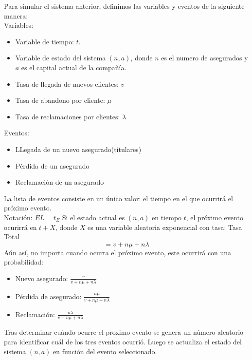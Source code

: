 \documentclass[12pt, a4paper]{article}
\begin{document}
Para simular el sistema anterior, definimos las variables y eventos de la siguiente manera:
\\
Variables: 
\begin{itemize}
    \item Variable de tiempo: $t$.
    \item Variable de estado del sistema $(n,a)$, donde $n$ es el numero de asegurados y $a$ es el capital actual de la compañía.
    \item Tasa de llegada de nuevos clientes: $v$
    \item Tasa de abandono por cliente: $\mu$
    \item Tasa de reclamaciones por clientes: $\lambda$
\end{itemize}
Eventos:
\begin{itemize}
    \item LLegada de un nuevo asegurado(titulares)
    \item Pérdida de un asegurado
    \item Reclamación de un asegurado
\end{itemize}
La lista de eventos consiste en un único valor: el tiempo en el que ocurrirá el próximo evento.\\
Notación: $EL = t_E$
Si el estado actual es $(n,a)$ en tiempo $t$, el próximo evento ocurirrá en $t + X$, donde $X$ es una variable
aleatoria exponencial con tasa:
Tasa Total $$ = v + n\mu + n\lambda$$
Aún así, no importa cuando ocurra el próximo evento, este ocurrirá con una probabilidad:
\begin{itemize}
    \item Nuevo asegurado: $\frac{v}{v+n\mu+n\lambda}$
    \item Pérdida de asegurado: $\frac{n\mu}{v+n\mu+n\lambda}$
    \item Reclamación: $\frac{n\lambda}{v+n\mu+n\lambda}$
\end{itemize}
Tras determinar cuándo ocurre el proximo evento se genera un número aleatorio para identificar
cuál de los tres eventos ocurrió. Luego se actualiza el estado del sistema $(n,a)$ en función del evento seleccionado.
\end{document}
